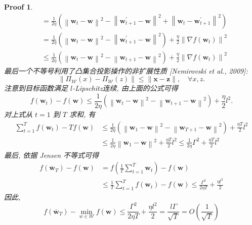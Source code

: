 \documentclass[a4paper,UTF8]{article}
\numberwithin{equation}{section}
\newtheorem*{myProof}{Proof}
\begin{document}
\begin{myProof}
		$$
		\begin{aligned}
			&=\frac{1}{2 \eta}\left(\left\|\boldsymbol{w}_{t}-\boldsymbol{w}\right\|^{2}-\left\|\boldsymbol{w}_{t+1}^{\prime}-\boldsymbol{w}\right\|^{2}+\left\|\boldsymbol{w}_{t}-\boldsymbol{w}_{t+1}^{\prime}\right\|^{2}\right) \\
			&=\frac{1}{2 \eta}\left(\left\|\boldsymbol{w}_{t}-\boldsymbol{w}\right\|^{2}-\left\|\boldsymbol{w}_{t+1}^{\prime}-\boldsymbol{w}\right\|^{2}\right)+\frac{\eta}{2}\left\|\nabla f\left(\boldsymbol{w}_{t}\right)\right\|^{2} \\
			&\leqslant \frac{1}{2 \eta}\left(\left\|\boldsymbol{w}_{t}-\boldsymbol{w}\right\|^{2}-\left\|\boldsymbol{w}_{t+1}-\boldsymbol{w}\right\|^{2}\right)+\frac{\eta}{2}\left\|\nabla f\left(\boldsymbol{w}_{t}\right)\right\|^{2}
		\end{aligned}
		$$
		最后一个不等号利用了凸集合投影操作的非扩展性质 [Nemirovski et al., 2009]:
		$$
		\left\|\Pi_{\mathcal{W}}(x)-\Pi_{\mathcal{W}}(z)\right\| \leqslant\|\boldsymbol{x}-\boldsymbol{z}\|, \quad \forall x, z .
		$$
		注意到目标函数满足 $l$-Lipschitz连续, 由上面的公式可得
		$$
		f\left(\boldsymbol{w}_{t}\right)-f(\boldsymbol{w}) \leqslant \frac{1}{2 \eta}\left(\left\|\boldsymbol{w}_{t}-\boldsymbol{w}\right\|^{2}-\left\|\boldsymbol{w}_{t+1}-\boldsymbol{w}\right\|^{2}\right)+\frac{\eta}{2} l^{2} .
		$$
		对上式从 $t=1$ 到 $T$ 求和, 有
		$$
		\begin{aligned}
			\sum_{t=1}^{T} f\left(\boldsymbol{w}_{t}\right)-T f(\boldsymbol{w}) & \leqslant \frac{1}{2 \eta}\left(\left\|\boldsymbol{w}_{1}-\boldsymbol{w}\right\|^{2}-\left\|\boldsymbol{w}_{T+1}-\boldsymbol{w}\right\|^{2}\right)+\frac{\eta T}{2} l^{2} \\
			& \leqslant \frac{1}{2 \eta}\left\|\boldsymbol{w}_{1}-\boldsymbol{w}\right\|^{2}+\frac{\eta T}{2} l^{2} \leqslant \frac{1}{2 \eta} \Gamma^{2}+\frac{\eta T}{2} l^{2}
		\end{aligned}
		$$
		最后, 依据 Jensen 不等式可得
		$$
		\begin{aligned}
			f\left(\overline{\boldsymbol{w}}_{T}\right)-f(\boldsymbol{w}) &=f\left(\frac{1}{T} \sum_{t=1}^{T} \boldsymbol{w}_{t}\right)-f(\boldsymbol{w}) \\
			& \leqslant \frac{1}{T} \sum_{t=1}^{T} f\left(\boldsymbol{w}_{t}\right)-f(\boldsymbol{w}) \leqslant \frac{\Gamma^{2}}{2 \eta T}+\frac{\eta l^{2}}{2}
		\end{aligned}
		$$
		因此,
		$$
		f\left(\overline{\boldsymbol{w}}_{T}\right)-\min _{w \in \mathcal{W}} f(\boldsymbol{w}) \leqslant \frac{\Gamma^{2}}{2 \eta T}+\frac{\eta l^{2}}{2}=\frac{l \Gamma}{\sqrt{T}}=O\left(\frac{1}{\sqrt{T}}\right)
		$$
		

\end{myProof}
\end{document}
